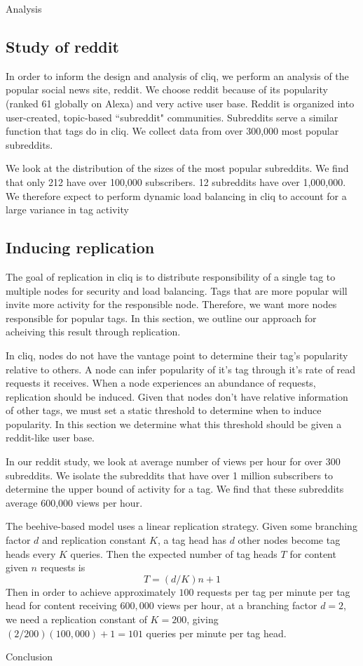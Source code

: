 \documentclass{sig-alternate}
\begin{document}
\begin{section}{Analysis}

\subsection{Study of reddit}
\label{subsec:redditstudy}

In order to inform the design and analysis of cliq, we perform an analysis of the popular social news site, reddit. We choose reddit because of its popularity (ranked 61 globally on Alexa) and very active user base. Reddit is organized into user-created, topic-based ``subreddit" communities. Subreddits serve a similar function that tags do in cliq. We collect data from over 300,000 most popular subreddits.

We look at the distribution of the sizes of the most popular subreddits. We find that only 212 have over 100,000 subscribers. 12 subreddits have over 1,000,000. We therefore expect to perform dynamic load balancing in cliq 
to account for a large variance in tag activity

\subsection{Inducing replication}
\label{subsec:inducereplication} 
The goal of replication in cliq is to distribute responsibility of a single tag to multiple nodes for security and load balancing. Tags that are more popular will invite more activity for the responsible node. Therefore, we want more nodes responsible for popular tags. In this section, we outline our approach for acheiving this result through replication.

In cliq, nodes do not have the vantage point to determine their tag's popularity relative to others. A node can infer popularity of it's tag through it's rate of read requests it receives. When a node experiences an abundance of requests, replication should be induced. Given that nodes don't have relative information of other tags, we must set a static threshold to determine when to induce popularity. In this section we determine what this threshold should be given a reddit-like user base. 

In our reddit study, we look at average number of views per hour for over 300 subreddits. We isolate the subreddits that have over 1 million subscribers to determine the upper bound of activity for a tag. We find that these subreddits average 600,000 views per hour. 

The beehive-based model uses a linear replication strategy. Given some
branching factor $d$ and replication constant $K$, a tag head has $d$
other nodes become tag heads every $K$ queries. Then the expected
number of tag heads $T$ for content given $n$ requests is
\[ 
T = (d/K)n + 1
\]
Then in order to achieve approximately $100$ requests per tag per
minute per tag head for content receiving $600,000$ views per hour, at
a branching factor $d = 2$, we need a replication constant of $K =
200$, giving $(2/200)(100,000) + 1 = 101$ queries per minute per tag
head.

\end{section}

\begin{section}{Conclusion}
  
\end{section}



\end{document}
